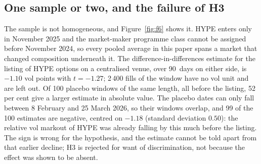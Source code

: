 \documentclass[a4paper,fleqn]{cas-dc}
\begin{document}
\subsection{One sample or two, and the failure of H3}
The sample is not homogeneous, and Figure~\ref{fig:f6} shows it. HYPE enters
only in November 2025 and the market-maker programme class cannot be assigned before November 2024, so
every pooled average in this paper spans a market that changed composition underneath it. The difference-in-differences estimate for the listing of HYPE options on a centralised
venue, over 90~days on either side, is $-1.10$ vol points with $t = -1.27$; 2\,400 fills of the window have
no vol unit and are left out. Of 100 placebo windows of the same length, all before the listing, 52 per cent
give a larger estimate in absolute value. The placebo dates can only fall between 8 February and 25 March
2026, so their windows overlap, and 99 of the 100 estimates are negative, centred on $-1.18$ (standard
deviation $0.50$): the relative vol markout of HYPE was already falling by this much before the listing. The
sign is wrong for the hypothesis, and the estimate cannot be told apart from that earlier decline; H3 is rejected for want of discrimination, not because the effect was shown
to be absent.
\end{document}
